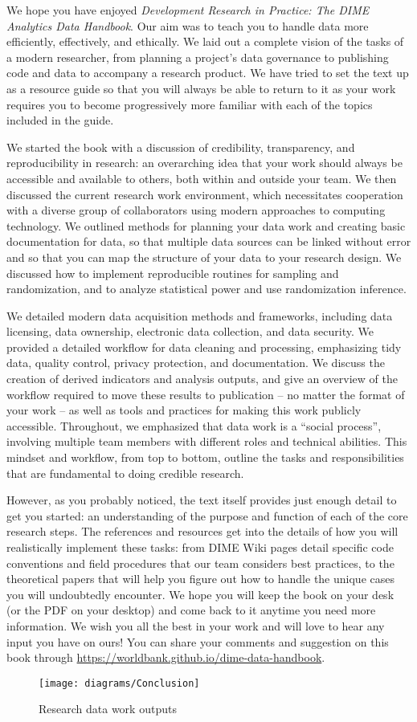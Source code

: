 We hope you have enjoyed \textit{Development Research in Practice: The DIME Analytics Data Handbook}.
Our aim was to teach you to handle data more efficiently, effectively, and ethically.
We laid out a complete vision of the tasks of a modern researcher,
from planning a project's data governance to publishing code and data
to accompany a research product.
We have tried to set the text up as a resource guide
so that you will always be able to return to it
as your work requires you to become progressively more familiar
with each of the topics included in the guide.

We started the book with a discussion of 
credibility, transparency, and reproducibility in research:
an overarching idea that your work should always be
accessible and available to others, both within and outside your team.
We then discussed the current research work environment,
which necessitates cooperation with a diverse group of collaborators
using modern approaches to computing technology.
We outlined methods for planning your data work
and creating basic documentation for data,
so that multiple data sources can be linked without error
and so that you can map the structure of your data
to your research design.
We discussed how to implement reproducible routines for sampling and randomization,
and to analyze statistical power and use randomization inference.

We detailed modern data acquisition methods and frameworks,
including data licensing, data ownership,
electronic data collection, and data security.
We provided a detailed workflow for data cleaning and processing,
emphasizing tidy data, quality control, privacy protection, and documentation.
We discuss the creation of derived indicators and analysis outputs,
and give an overview of the workflow required to move these results
to publication -- no matter the format of your work --
as well as tools and practices for making this work publicly accessible.
Throughout, we emphasized that data work is a ``social process'',
involving multiple team members with different roles and technical abilities.
This mindset and workflow, from top to bottom,
outline the tasks and responsibilities
that are fundamental to doing credible research.

However, as you probably noticed, the text itself provides
just enough detail to get you started:
an understanding of the purpose and function of each of the core research steps.
The references and resources get into the details
of how you will realistically implement these tasks:
from DIME Wiki pages detail specific code conventions
and field procedures that our team considers best practices,
to the theoretical papers that will help you figure out
how to handle the unique cases you will undoubtedly encounter.
We hope you will keep the book on your desk
(or the PDF on your desktop)
and come back to it anytime you need more information.
We wish you all the best in your work
and will love to hear any input you have on ours!
You can share your comments and suggestion on this book through 
\url{https://worldbank.github.io/dime-data-handbook}.

\vspace{1cm}
\begin{fullwidth}
	\begin{figure}
		\centering
		\texttt{[image: diagrams/Conclusion]}
		\caption{Research data work outputs}
		\label{fig:conclusion}
	\end{figure}
\end{fullwidth}
